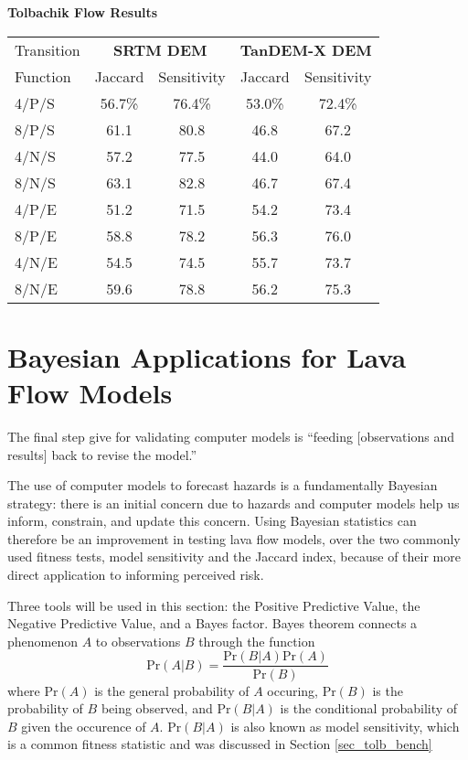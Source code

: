 		\begin{center}
			\textbf{Tolbachik Flow Results}\\
			\begin{tabular}{l c c | c c}
				\toprule
				Transition&\multicolumn{2}{c}{\textbf{SRTM DEM}}&\multicolumn{2}{c}{\textbf{TanDEM-X DEM}}\\
				Function& Jaccard & Sensitivity& Jaccard & Sensitivity\\
				\midrule
				4/P/S & 56.7\%& 76.4\%& 53.0\%& 72.4\% \\
				8/P/S & 61.1  & 80.8  & 46.8  & 67.2   \\
				4/N/S & 57.2  & 77.5  & 44.0  & 64.0   \\
				8/N/S & 63.1  & 82.8  & 46.7  & 67.4   \\
				4/P/E & 51.2  & 71.5  & 54.2  & 73.4   \\
				8/P/E & 58.8  & 78.2  & 56.3  & 76.0   \\
				4/N/E & 54.5  & 74.5  & 55.7  & 73.7   \\
				8/N/E & 59.6  & 78.8  & 56.2  & 75.3   \\
				
				\bottomrule
			\end{tabular}
		\end{center}


\section{Bayesian Applications for Lava Flow Models}\label{sec:Bayesian}
	The final step \citet{bayarri2007framework} give for validating computer models is ``feeding [observations and results] back to revise the model.''
	
	The use of computer models to forecast hazards is a fundamentally Bayesian strategy: there is an initial concern due to hazards and computer models help us inform, constrain, and update this concern. Using Bayesian statistics can therefore be an improvement in testing lava flow models, over the two commonly used fitness tests, model sensitivity and the Jaccard index, because of their more direct application to informing perceived risk. 
	
	Three tools will be used in this section: the Positive Predictive Value, the Negative Predictive Value, and a Bayes factor. Bayes theorem connects a phenomenon $A$ to observations $B$ through the function
	\begin{equation}
		\text{Pr}(A|B)=\frac{\text{Pr}(B|A)\text{Pr}(A)}{\text{Pr}(B)}\label{eq_bayes}
	\end{equation}
	where $\text{Pr}(A)$ is the general probability of $A$ occuring, $\text{Pr}(B)$ is the probability of $B$ being observed, and $\text{Pr}(B|A)$ is the conditional probability of $B$ given the occurence of $A$. $\text{Pr}(B|A)$ is also known as model sensitivity, which is a common fitness statistic and was discussed in Section \ref{sec_tolb_bench}
	
